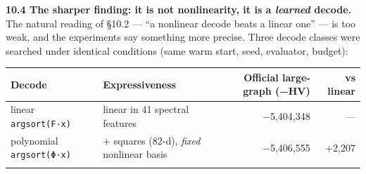 \documentclass[
  11pt,
]{article}
\begin{document}
\textbf{10.4 The sharper finding: it is not nonlinearity, it is a
\emph{learned} decode.} The natural reading of §10.2 --- ``a nonlinear
decode beats a linear one'' --- is too weak, and the experiments say
something more precise. Three decode classes were searched under
identical conditions (same warm start, seed, evaluator, budget):

\begin{longtable}[]{@{}llrr@{}}
\toprule
\begin{minipage}[b]{0.19\columnwidth}\raggedright
Decode\strut
\end{minipage} & \begin{minipage}[b]{0.19\columnwidth}\raggedright
Expressiveness\strut
\end{minipage} & \begin{minipage}[b]{0.25\columnwidth}\raggedleft
Official large-graph (−HV)\strut
\end{minipage} & \begin{minipage}[b]{0.25\columnwidth}\raggedleft
vs linear\strut
\end{minipage}\tabularnewline
\midrule
\endhead
\begin{minipage}[t]{0.19\columnwidth}\raggedright
linear \texttt{argsort(F·x)}\strut
\end{minipage} & \begin{minipage}[t]{0.19\columnwidth}\raggedright
linear in 41 spectral features\strut
\end{minipage} & \begin{minipage}[t]{0.25\columnwidth}\raggedleft
−5,404,348\strut
\end{minipage} & \begin{minipage}[t]{0.25\columnwidth}\raggedleft
---\strut
\end{minipage}\tabularnewline
\begin{minipage}[t]{0.19\columnwidth}\raggedright
polynomial \texttt{argsort(Φ·x)}\strut
\end{minipage} & \begin{minipage}[t]{0.19\columnwidth}\raggedright
+ squares (82-d), \emph{fixed} nonlinear basis\strut
\end{minipage} & \begin{minipage}[t]{0.25\columnwidth}\raggedleft
−5,406,555\strut
\end{minipage} & \begin{minipage}[t]{0.25\columnwidth}\raggedleft
+2,207\strut
\end{minipage}\tabularnewline
\begin{minipage}[t]{0.19\columnwidth}\raggedright

\end{minipage}
\end{longtable}
\end{document}

